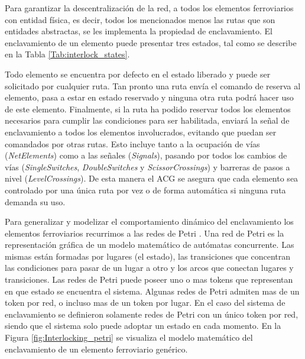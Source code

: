 Para garantizar la descentralización de la red, a todos los elementos ferroviarios con entidad física, es decir, todos los mencionados menos las rutas que son entidades abstractas, se les implementa la propiedad de enclavamiento. El enclavamiento de un elemento puede presentar tres estados, tal como se describe en la Tabla \ref{Tab:interlock_states}.

	\begin{table}[!h]
	{
		\caption{Estados de enclavamiento de cada elemento ferroviario.}
		\label{Tab:interlock_states}
		\centering
	}
	\end{table}

Todo elemento se encuentra por defecto en el estado liberado y puede ser solicitado por cualquier ruta. Tan pronto una ruta envía el comando de reserva al elemento, pasa a estar en estado reservado y ninguna otra ruta podrá hacer uso de este elemento. Finalmente, si la ruta ha podido reservar todos los elementos necesarios para cumplir las condiciones para ser habilitada, enviará la señal de enclavamiento a todos los elementos involucrados, evitando que puedan ser comandados por otras rutas. Esto incluye tanto a la ocupación de vías (\textit{NetElements}) como a las señales (\textit{Signals}), pasando por todos los cambios de vías (\textit{SingleSwitches}, \textit{DoubleSwitches} y \textit{ScissorCrossings}) y barreras de pasos a nivel (\textit{LevelCrossings}). De esta manera el ACG se asegura que cada elemento sea controlado por una única ruta por vez o de forma automática si ninguna ruta demanda su uso.

Para generalizar y modelizar el comportamiento dinámico del enclavamiento los elementos ferroviarios recurrimos a las redes de Petri \cite{Paper_64,Paper_65,Paper_88,Paper_94,Paper_95,Paper_123,Paper_196}. Una red de Petri es la representación gráfica de un modelo matemático de autómatas concurrente. Las mismas están formadas por lugares (el estado), las transiciones que concentran las condiciones para pasar de un lugar a otro y los arcos que conectan lugares y transiciones. Las redes de Petri puede poseer uno o mas tokens que representan en que estado se encuentra el sistema. Algunas redes de Petri admiten mas de un token por red, o incluso mas de un token por lugar. En el caso del sistema de enclavamiento se definieron solamente redes de Petri con un único token por red, siendo que el sistema solo puede adoptar un estado en cada momento. En la Figura \ref{fig:Interlocking_petri} se visualiza el modelo matemático del enclavamiento de un elemento ferroviario genérico.

